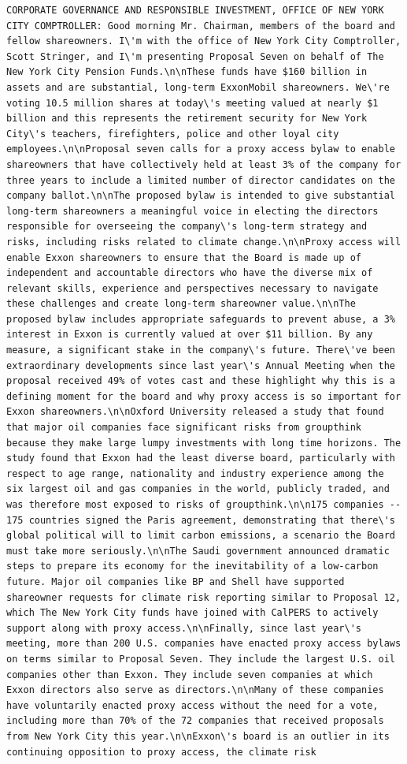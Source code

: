 \documentclass[
  letterpaper,
  DIV=11,
  numbers=noendperiod]{scrreprt}
\begin{document}
\begin{verbatim}
CORPORATE GOVERNANCE AND RESPONSIBLE INVESTMENT, OFFICE OF NEW YORK CITY COMPTROLLER: Good morning Mr. Chairman, members of the board and fellow shareowners. I\'m with the office of New York City Comptroller, Scott Stringer, and I\'m presenting Proposal Seven on behalf of The New York City Pension Funds.\n\nThese funds have $160 billion in assets and are substantial, long-term ExxonMobil shareowners. We\'re voting 10.5 million shares at today\'s meeting valued at nearly $1 billion and this represents the retirement security for New York City\'s teachers, firefighters, police and other loyal city employees.\n\nProposal seven calls for a proxy access bylaw to enable shareowners that have collectively held at least 3% of the company for three years to include a limited number of director candidates on the company ballot.\n\nThe proposed bylaw is intended to give substantial long-term shareowners a meaningful voice in electing the directors responsible for overseeing the company\'s long-term strategy and risks, including risks related to climate change.\n\nProxy access will enable Exxon shareowners to ensure that the Board is made up of independent and accountable directors who have the diverse mix of relevant skills, experience and perspectives necessary to navigate these challenges and create long-term shareowner value.\n\nThe proposed bylaw includes appropriate safeguards to prevent abuse, a 3% interest in Exxon is currently valued at over $11 billion. By any measure, a significant stake in the company\'s future. There\'ve been extraordinary developments since last year\'s Annual Meeting when the proposal received 49% of votes cast and these highlight why this is a defining moment for the board and why proxy access is so important for Exxon shareowners.\n\nOxford University released a study that found that major oil companies face significant risks from groupthink because they make large lumpy investments with long time horizons. The study found that Exxon had the least diverse board, particularly with respect to age range, nationality and industry experience among the six largest oil and gas companies in the world, publicly traded, and was therefore most exposed to risks of groupthink.\n\n175 companies -- 175 countries signed the Paris agreement, demonstrating that there\'s global political will to limit carbon emissions, a scenario the Board must take more seriously.\n\nThe Saudi government announced dramatic steps to prepare its economy for the inevitability of a low-carbon future. Major oil companies like BP and Shell have supported shareowner requests for climate risk reporting similar to Proposal 12, which The New York City funds have joined with CalPERS to actively support along with proxy access.\n\nFinally, since last year\'s meeting, more than 200 U.S. companies have enacted proxy access bylaws on terms similar to Proposal Seven. They include the largest U.S. oil companies other than Exxon. They include seven companies at which Exxon directors also serve as directors.\n\nMany of these companies have voluntarily enacted proxy access without the need for a vote, including more than 70% of the 72 companies that received proposals from New York City this year.\n\nExxon\'s board is an outlier in its continuing opposition to proxy access, the climate risk 
\end{verbatim}
\end{document}
